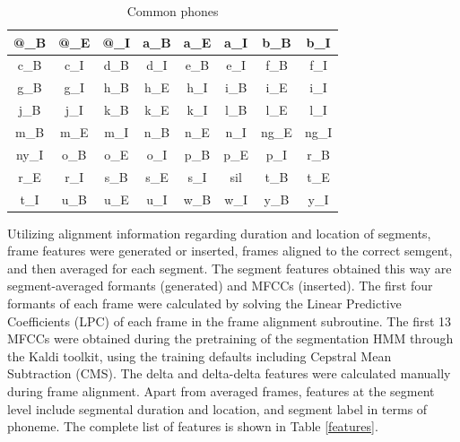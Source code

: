 \documentclass[conference]{IEEEtran}
\begin{document}
\begin{table}[!htb]
\renewcommand{\arraystretch}{1.3}
\caption{Common phones}
\label{phones}
\centering
\begin{tabular}{|c|c|c|c|c|c|c|c|}
    \hline
    @\_B & @\_E & @\_I & a\_B & a\_E & a\_I & b\_B & b\_I\\
    \hline
    c\_B & c\_I & d\_B & d\_I & e\_B & e\_I & f\_B & f\_I\\
    \hline
    g\_B & g\_I & h\_B & h\_E & h\_I & i\_B & i\_E & i\_I\\
    \hline
    j\_B & j\_I & k\_B & k\_E & k\_I & l\_B & l\_E & l\_I\\
    \hline
    m\_B & m\_E & m\_I & n\_B & n\_E & n\_I & ng\_E & ng\_I\\
    \hline
    ny\_I & o\_B & o\_E & o\_I & p\_B & p\_E & p\_I & r\_B\\
    \hline
    r\_E & r\_I & s\_B & s\_E & s\_I & sil & t\_B & t\_E\\
    \hline
    t\_I & u\_B & u\_E & u\_I & w\_B & w\_I & y\_B & y\_I\\
    \hline
\end{tabular}
\end{table}

Utilizing alignment information regarding duration and location of segments, frame features were generated or inserted, frames aligned to the correct semgent, and then averaged for each segment.
The segment features obtained this way are segment-averaged formants (generated) and MFCCs (inserted).
The first four formants of each frame were calculated by solving the Linear Predictive Coefficients (LPC) of each frame in the frame alignment subroutine.
The first 13 MFCCs were obtained during the pretraining of the segmentation HMM through the Kaldi toolkit, using the training defaults including Cepstral Mean Subtraction (CMS).
The delta and delta-delta features were calculated manually during frame alignment.
Apart from averaged frames, features at the segment level include segmental duration and location, and segment label in terms of phoneme. 
The complete list of features is shown in Table \ref{features}.
\end{document}
